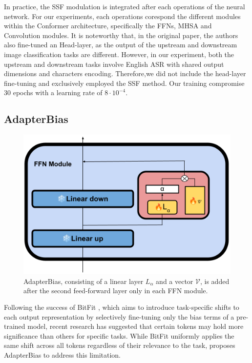 In practice, the \ac{SSF} modulation is integrated after each operations of the neural network. For our experiments, each operations corespond the different modules within the Conformer architecture, specifically the \acp{FFN}, \ac{MHSA} and Convolution modules. It is noteworthy that, in the original paper, the authors also fine-tuned an Head-layer, as the output of the upstream and downstream image classification tasks are different. However, in our experiment, both the upstream and downstream tasks involve English \ac{ASR} with shared output dimensions and characters encoding. Therefore,we did not include the head-layer fine-tuning and exclusively employed the \ac{SSF} method. Our training compromise 30 epochs with a learning rate of $8\cdot10^{-4}$.


\subsection{AdapterBias}
\begin{figure}
    \begin{center}
        \includegraphics[scale=0.4]{imgs/AdapterBias.png}
        \caption{ AdapterBias, consisting of a linear layer $L_\alpha$ and a vector $\mathcal{V}$, is added after the second feed-forward layer only in each FFN module.}
        \label{fig:AdapterBias}
    \end{center}
\end{figure}
Following the success of BitFit \cite{ben-zaken-etal-2022-bitfit}, which aims to introduce task-specific shifts to each output representation by selectively fine-tuning only the bias terms of a pre-trained model, recent research has suggested that certain tokens may hold more significance than others for specific tasks. While BitFit uniformly applies the same shift across all tokens regardless of their relevance to the task, \cite{fu-etal-2022-adapterbias} proposes AdapterBias to address this limitation.

